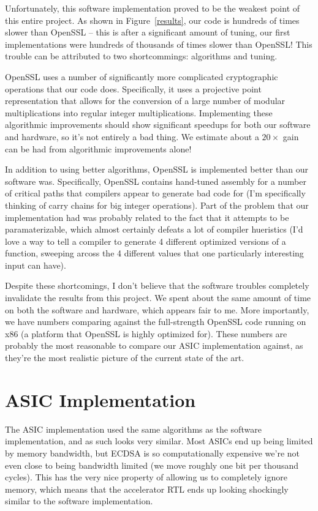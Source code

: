 \documentclass[twocolumn]{article}
\begin{document}
Unfortunately, this software implementation proved to be the weakest
point of this entire project.  As shown in Figure~\ref{results}, our
code is hundreds of times slower than OpenSSL -- this is after a
significant amount of tuning, our first implementations were hundreds
of thousands of times slower than OpenSSL!  This trouble can be
attributed to two shortcommings: algorithms and tuning.

OpenSSL uses a number of significantly more complicated cryptographic
operations that our code does.  Specifically, it uses a projective
point representation that allows for the conversion of a large number
of modular multiplications into regular integer multiplications.
Implementing these algorithmic improvements should show significant
speedups for both our software and hardware, so it's not entirely a
bad thing.  We estimate about a $20\times$ gain can be had from
algorithmic improvements alone!

In addition to using better algorithms, OpenSSL is implemented better
than our software was.  Specifically, OpenSSL contains hand-tuned
assembly for a number of critical paths that compilers appear to
generate bad code for (I'm specifically thinking of carry chains for
big integer operations).  Part of the problem that our implementation
had was probably related to the fact that it attempts to be
paramaterizable, which almost certainly defeats a lot of compiler
hueristics (I'd love a way to tell a compiler to generate 4 different
optimized versions of a function, sweeping arcoss the 4 different
values that one particularly interesting input can have).

Despite these shortcomings, I don't believe that the software troubles
completely invalidate the results from this project.  We spent about
the same amount of time on both the software and hardware, which
appears fair to me.  More importantly, we have numbers comparing
against the full-strength OpenSSL code running on x86 (a platform that
OpenSSL is highly optimized for\cite{kasper-openssl_ecc}).  These
numbers are probably the most reasonable to compare our ASIC
implementation against, as they're the most realistic picture of the
current state of the art.

\section{ASIC Implementation}

The ASIC implementation used the same algorithms as the software
implementation, and as such looks very similar.  Most ASICs end up
being limited by memory bandwidth, but ECDSA is so computationally
expensive we're not even close to being bandwidth limited (we move
roughly one bit per thousand cycles).  This has the very nice property
of allowing us to completely ignore memory, which means that the
accelerator RTL ends up looking shockingly similar to the software
implementation.
\end{document}
